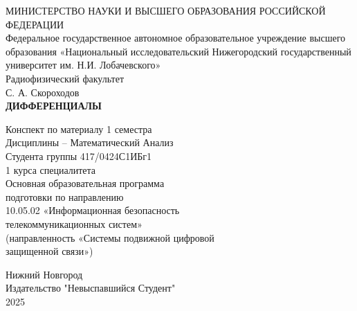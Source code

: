 \begin{titlepage}

	\centering
	МИНИСТЕРСТВО НАУКИ И ВЫСШЕГО ОБРАЗОВАНИЯ РОССИЙСКОЙ
	ФЕДЕРАЦИИ\\

	\hfill \break
	Федеральное государственное автономное образовательное учреждение высшего образования «Национальный исследовательский Нижегородский государственный университет им. Н.И. Лобачевского»\\

	\hfill \break
	Радиофизический факультет\\
	\vspace{1.5cm}
	С. А. Скороходов\\

	\hfill \break
	\MakeUppercase{\huge\bf Дифференциалы}

	\vspace{1cm}
	{Конспект по материалу 1 семестра \\ Дисциплины -- Математический Анализ}\\[1cm]

	Студента группы 417/0424С1ИБг1\\
	1 курса специалитета\\
	\hfill \break
	Основная образовательная программа\\
	подготовки по направлению\\
	10.05.02 «Информационная безопасность\\
	телекоммуникационных систем»\\
	(направленность «Системы подвижной цифровой\\
	защищенной связи»)

	\vfill
	Нижний Новгород \\ Издательство "Невыспавшийся Студент" \\ 2025
\end{titlepage}